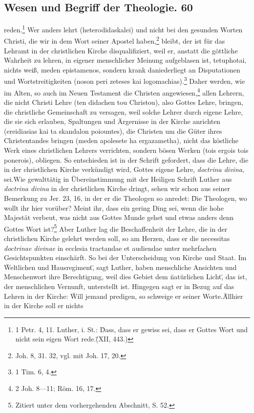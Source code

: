 \subsection*{Wesen und Begriff der Theologie. \hfill 60}\setcounter{footnote}{210}reden.\footnote{1 Petr. 4, 11. Luther, i. St.: \"Dass, dass er gewiss sei, dass er Gottes Wort und nicht sein eigen Wort rede.\" (XII, 443.)} Wer anders lehrt (heterodidaskalei) und nicht bei den gesunden Worten Christi, die wir in dem Wort seiner Apostel haben,\footnote{Joh. 8, 31. 32, vgl. mit Joh. 17, 20.} bleibt, der ist für das Lehramt in der christlichen Kirche disqualifiziert, weil er, anstatt die göttliche Wahrheit zu lehren, in eigener menschlicher Meinung aufgeblasen ist, tetuphotai, nichts weiß, meden epistamenos, sondern krank daniederliegt an Disputationen und Wortstreitigkeiten (noson peri zeteses kai logomachias).\footnote{1 Tim. 6, 4.} Daher werden, wie im Alten, so auch im Neuen Testament die Christen angewiesen,\footnote{2 Joh. 8---11; Röm. 16, 17.} allen Lehrern, die nicht Christi Lehre (ten didachen tou Christou), also Gottes Lehre, bringen, die christliche Gemeinschaft zu versagen, weil solche Lehrer durch eigene Lehre, die sie sich erlauben, Spaltungen und Ärgernisse in der Kirche anrichten (ereidiasias kai ta skandalon poiountes), die Christen um die Güter ihres Christentandes bringen (meden apolesete ha ergazametha), nicht das köstliche Werk eines christlichen Lehrers verrichten, sondern bösen Werken (tois ergois tois ponerois), obliegen. So entschieden ist in der Schrift gefordert, dass die Lehre, die in der christlichen Kirche verkündigt wird, Gottes eigene Lehre, \emph{doctrina divina}, sei.Wie gewalttätig in Übereinstimmung mit der Heiligen Schrift Luther aus \emph{doctrina divina} in der christlichen Kirche dringt, sehen wir schon aus seiner Bemerkung zu Jer. 23, 16, in der er die Theologen so anredet: \"Die Theologen, wo wollt ihr hier vorüber? Meint ihr, dass ein gering Ding sei, wenn die hohe Majestät verbeut, was nicht aus Gottes Munde gehet und etwas anders denn Gottes Wort ist?\"\footnote{Zitiert unter dem vorhergehenden Abschnitt, S. 52.} Aber Luther lag die Beschaffenheit der Lehre, die in der christlichen Kirche gelehrt werden soll, so am Herzen, dass er die necessitas \emph{doctrinae divinae} in ecclesia tractandae et audiendae unter mehrfachen Gesichtspunkten einschärft. So bei der Unterscheidung von Kirche und Staat. Im \"Weltlichen und Hausregiment\", sagt Luther, haben menschliche Ansichten und Menschenwort ihre Berechtigung, weil dies Gebiet dem \"natürlichen Licht\", das ist, der menschlichen Vernunft, unterstellt ist. Hingegen sagt er in Bezug auf das Lehren in der Kirche: \"Will jemand predigen, so schweige er seiner Worte.\" \"Allhier in der Kirche soll er nichts